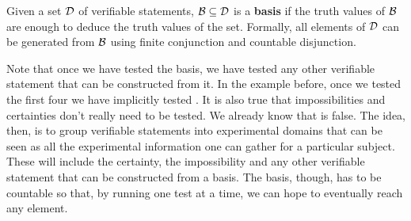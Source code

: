 	\begin{mathSection}
		\begin{defn}
			Given a set $\mathcal{D}$ of verifiable statements, $\mathcal{B} \subseteq \mathcal{D}$ is a \textbf{basis} if the truth values of $\mathcal{B}$ are enough to deduce the truth values of the set. Formally, all elements of $\mathcal{D}$ can be generated from $\mathcal{B}$ using finite conjunction and countable disjunction.
		\end{defn}
	\end{mathSection}
	
	Note that once we have tested the basis, we have tested any other verifiable statement that can be constructed from it. In the example before, once we tested the first four we have implicitly tested . It is also true that impossibilities and certainties don't really need to be tested. We already know that  is false. The idea, then, is to group verifiable statements into experimental domains that can be seen as all the experimental information one can gather for a particular subject. These will include the certainty, the impossibility and any other verifiable statement that can be constructed from a basis. The basis, though, has to be countable so that, by running one test at a time, we can hope to eventually reach any element.
	
